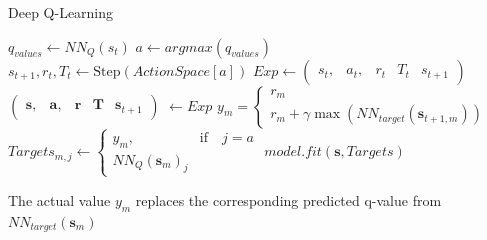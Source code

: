 \documentclass{LTHtwocol} %
\begin{document}
\begin{algorithm}[H]
	\label{alg:deep_q_training}
	\caption{Deep Q-Learning}
	\begin{algorithmic}
			 
				\State $q_{values} \gets NN_Q(s_t)$  %
				\State $a \gets argmax(q_{values})$ 	 
				\State $s_{t+1}, r_t, T_t \gets \text{Step}(ActionSpace[a])$ %
				\State $Exp \gets \begin{pmatrix} s_t, & a_t, & r_t & T_t & s_{t+1} \end{pmatrix}$
				\State $\begin{pmatrix} \mathbf{s}, & \mathbf{a}, & \mathbf{r} & \mathbf{T} & \mathbf{s}_{t+1} \end{pmatrix}$ $\gets Exp$  
				\State $y_m = \begin{cases} r_m \\ r_m + \gamma \max ( NN_{target}(\mathbf{s}_{t+1, m}) ) \end{cases}$
				\State $Targets_{m,j} \gets \begin{cases} y_m, & \text{if} \quad j = a  \\ NN_Q(\mathbf{s}_m)_j \end{cases}$
				\State $model.fit(\mathbf{s}, Targets)$
			\EndWhile
		\EndFor
	\end{algorithmic}
\end{algorithm}
The actual value $y_m$ replaces the corresponding predicted q-value from $NN_{target}(\mathbf{s}_m)$




\end{document}
